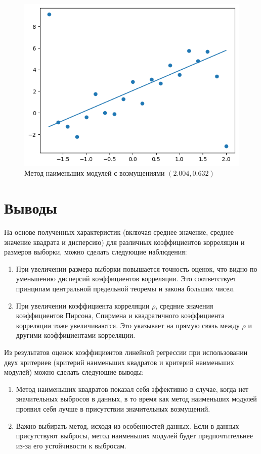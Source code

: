 \documentclass[12pt,a4paper]{article}
\begin{document}
	\begin{figure}[htbp!]
		\begin{center}
			\includegraphics[width = 1\linewidth]{graphics/lab6_sq_mod.png}
			\caption{Метод наименьших модулей с возмущениями \( (2.004, 0.632) \)}
		\end{center}
	\end{figure}

	\section{Выводы}

	На основе полученных характеристик (включая среднее значение, среднее
	значение квадрата и дисперсию) для различных коэффициентов корреляции и
	размеров выборки, можно сделать следующие наблюдения:

	\begin{enumerate}
		\item При увеличении размера выборки повышается точность оценок, что
		видно по уменьшению дисперсий коэффициентов корреляции. Это
		соответствует принципам центральной предельной теоремы и закона
		больших чисел.
		\item При увеличении коэффициента корреляции \( \rho \), средние
		значения коэффициентов Пирсона, Спирмена и квадратичного коэффициента
		корреляции тоже увеличиваются. Это указывает на прямую связь между
		\( \rho \) и другими коэффициентами корреляции.
	\end{enumerate}

	Из результатов оценок коэффициентов линейной регрессии при использовании
	двух критериев (критерий наименьших квадратов и критерий наименьших
	модулей) можно сделать следующие выводы:

	\begin{enumerate}
		\item Метод наименьших квадратов показал себя эффективно в случае,
		когда нет значительных выбросов в данных, в то время как метод
		наименьших модулей проявил себя лучше в присутствии значительных
		возмущений.
		\item Важно выбирать метод, исходя из особенностей данных. Если в
		данных присутствуют выбросы, метод наименьших модулей будет
		предпочтительнее из-за его устойчивости к выбросам.
	\end{enumerate}
\end{document}
